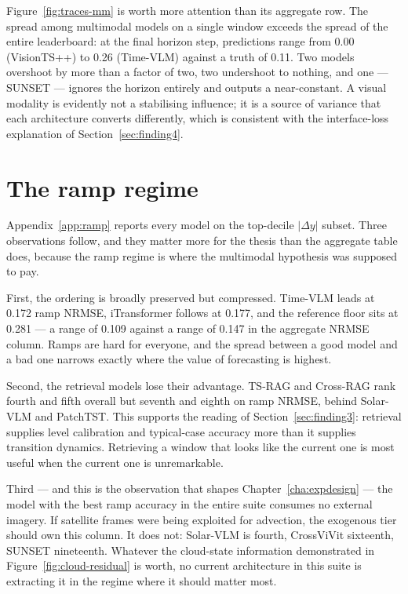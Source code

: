 Figure~\ref{fig:traces-mm} is worth more attention than its aggregate row. The spread among
multimodal models on a single window exceeds the spread of the entire leaderboard: at the
final horizon step, predictions range from 0.00 (VisionTS++) to 0.26 (Time-VLM) against a
truth of 0.11. Two models overshoot by more than a factor of two, two undershoot to nothing,
and one --- SUNSET --- ignores the horizon entirely and outputs a near-constant. A visual
modality is evidently not a stabilising influence; it is a source of variance that each
architecture converts differently, which is consistent with the interface-loss explanation of
Section~\ref{sec:finding4}.

\section{The ramp regime}
\label{sec:ramp-results}

Appendix~\ref{app:ramp} reports every model on the top-decile $|\Delta y|$ subset. Three
observations follow, and they matter more for the thesis than the aggregate table does,
because the ramp regime is where the multimodal hypothesis was supposed to pay.

First, the ordering is broadly preserved but compressed. Time-VLM leads at 0.172 ramp NRMSE,
iTransformer follows at 0.177, and the reference floor sits at 0.281 --- a range of 0.109
against a range of 0.147 in the aggregate NRMSE column. Ramps are hard for everyone, and the
spread between a good model and a bad one narrows exactly where the value of forecasting is
highest.

Second, the retrieval models lose their advantage. TS-RAG and Cross-RAG rank fourth and fifth
overall but seventh and eighth on ramp NRMSE, behind Solar-VLM and PatchTST. This supports the
reading of Section~\ref{sec:finding3}: retrieval supplies level calibration and typical-case
accuracy more than it supplies transition dynamics. Retrieving a window that looks like the
current one is most useful when the current one is unremarkable.

Third --- and this is the observation that shapes Chapter~\ref{cha:expdesign} --- the model
with the best ramp accuracy in the entire suite consumes no external imagery. If satellite
frames were being exploited for advection, the exogenous tier should own this column. It does
not: Solar-VLM is fourth, CrossViVit sixteenth, SUNSET nineteenth. Whatever the cloud-state
information demonstrated in Figure~\ref{fig:cloud-residual} is worth, no current architecture
in this suite is extracting it in the regime where it should matter most.

